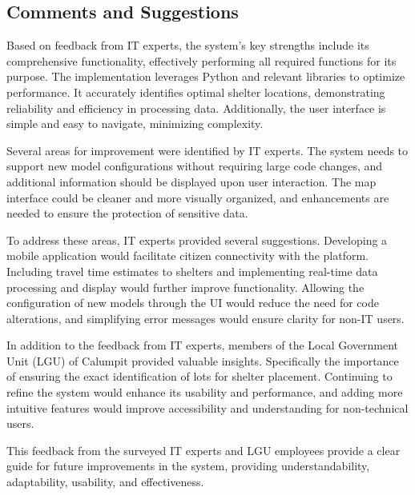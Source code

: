 \subsection{Comments and Suggestions}
	Based on feedback from IT experts, the system's key strengths include its comprehensive functionality, effectively performing all required functions for its purpose. The implementation leverages Python and relevant libraries to optimize performance. It accurately identifies optimal shelter locations, demonstrating reliability and efficiency in processing data. Additionally, the user interface is simple and easy to navigate, minimizing complexity.
	
	Several areas for improvement were identified by IT experts. The system needs to support new model configurations without requiring large code changes, and additional information should be displayed upon user interaction. The map interface could be cleaner and more visually organized, and enhancements are needed to ensure the protection of sensitive data.
	
	To address these areas, IT experts provided several suggestions. Developing a mobile application would facilitate citizen connectivity with the platform. Including travel time estimates to shelters and implementing real-time data processing and display would further improve functionality. Allowing the configuration of new models through the UI would reduce the need for code alterations, and simplifying error messages would ensure clarity for non-IT users.

	In addition to the feedback from IT experts, members of the Local Government Unit (LGU) of Calumpit provided valuable insights. Specifically the importance of ensuring the exact identification of lots for shelter placement. Continuing to refine the system would enhance its usability and performance, and adding more intuitive features would improve accessibility and understanding for non-technical users.
	
	This feedback from the surveyed IT experts and LGU employees provide a clear guide for future improvements in the system, providing understandability, adaptability, usability, and effectiveness.
	
